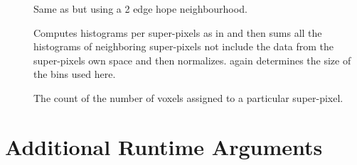 \begin{description}
\item[] Same as  but using a 2 edge hope neighbourhood. 
\item[] Computes histograms per super-pixels as in  and then sums all the histograms of neighboring super-pixels not include the data from the super-pixels own space and then normalizes.  again determines the size of the bins used here. 
\item[] The count of the number of voxels assigned to a particular super-pixel. 

\end{description}



\section{Additional Runtime Arguments }

